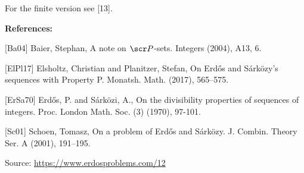 \documentclass{article}
\begin{document}
For the finite version see [13].

\bigskip
\noindent\textbf{References:}

[Ba04] Baier, Stephan, A note on {$\scr P$}-sets. Integers (2004), A13, 6.
 
 [ElPl17] Elsholtz, Christian and Planitzer, Stefan, On Erd\H{o}s and S\'{a}rk\"ozy's sequences with Property P. Monatsh. Math. (2017), 565--575.
 
 [ErSa70] Erd\H{o}s, P. and S\'{a}rk\"ozi, A., On the divisibility properties of sequences of integers. Proc. London Math. Soc. (3) (1970), 97-101.
 
 [Sc01] Schoen, Tomasz, On a problem of Erd\H{o}s and S\'{a}rk\"ozy. J. Combin. Theory Ser. A (2001), 191--195.

\bigskip
\noindent\small{Source: \url{https://www.erdosproblems.com/12}}
\end{document}
